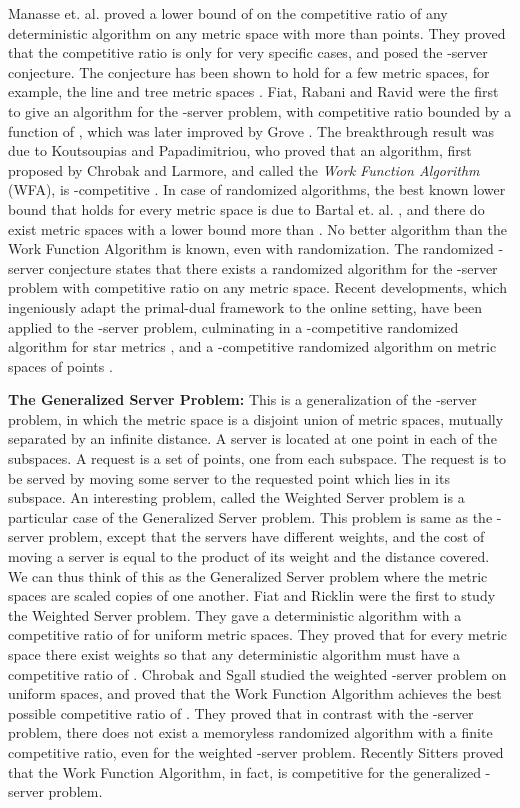 \documentclass[11pt]{article}
\theoremstyle{plain}\newtheorem{theorem}{Theorem}
\theoremstyle{definition}
\theoremstyle{remark}
\begin{document}
Manasse et. al. \cite{ManasseMS88} proved a lower bound of  on the competitive ratio of any deterministic algorithm on any metric space with more than  points. They proved that the competitive ratio is  only for very specific cases, and posed the -server conjecture.
The conjecture has been shown to hold for a few metric spaces, for example, the line \cite{ChrobakKPV91} and tree metric spaces \cite{ChrobakL91}.
Fiat, Rabani and Ravid \cite{FiatRR90} were the first to give an algorithm for the -server problem, with competitive ratio bounded by a function of , which was later improved by Grove \cite{Grove91,BartalG00}. The breakthrough result was due to Koutsoupias and Papadimitriou, who proved that an algorithm, first proposed by Chrobak and Larmore, and called the \textit{Work Function Algorithm} (WFA), is -competitive \cite{KoutsoupiasP95}.
In case of randomized algorithms, the best known lower bound that holds for every metric space is  due to Bartal et. al. \cite{BartalBM01}, and there do exist metric spaces with a lower bound more than  \cite{KarlinMMO94}. No better algorithm than the Work Function Algorithm is known, even with randomization. The randomized -server conjecture states that there exists a randomized algorithm for the -server problem with competitive ratio  on any metric space. 
Recent developments, which ingeniously adapt the primal-dual framework to the online setting, have been applied to the -server problem, culminating in a -competitive randomized algorithm for star metrics \cite{BansalBN07}, and a -competitive randomized algorithm on metric spaces of  points \cite{BansalBMN11}.

\noindent
\textbf{The Generalized Server Problem:} This is a generalization of the -server problem, in which the metric space is a disjoint union of  metric spaces, mutually separated by an infinite distance. A server is located at one point in each of the subspaces. A request is a set of  points, one from each subspace. The request is to be served by moving some server to the requested point which lies in its subspace. An interesting problem, called the Weighted Server problem \cite{FiatR94} is a particular case of the Generalized Server problem. This problem is same as the -server problem, except that the servers have different weights, and the cost of moving a server is equal to the product of its weight and the distance covered. We can thus think of this as the Generalized Server problem where the metric spaces are scaled copies of one another. Fiat and Ricklin \cite{FiatR94} were the first to study the Weighted Server problem. They gave a deterministic algorithm with a competitive ratio of  for uniform metric spaces. They proved that for every metric space there exist weights so that any deterministic algorithm must have a competitive ratio of . Chrobak and Sgall \cite{ChrobakS04} studied the weighted -server problem on uniform spaces, and proved that the Work Function Algorithm achieves the best possible competitive ratio of . They proved that in contrast with the -server problem, there does not exist a memoryless randomized algorithm with a finite competitive ratio, even for the weighted -server problem. Recently Sitters \cite{Sitters11} proved that the Work Function Algorithm, in fact, is competitive for the generalized -server problem.
\end{document}
